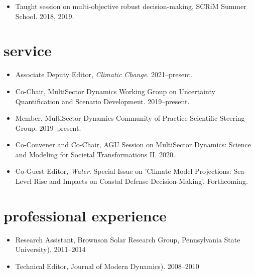 \documentclass[11pt,article,oneside]{memoir}
\begin{document}
\mbox{}\vspace{-\dimexpr\baselineskip\relax}

\begin{itemize}[label={}]

\item Taught session on multi-objective robust decision-making, SCRiM Summer School. 2018, 2019.

\end{itemize}


\section{service}

\mbox{}\vspace{-\dimexpr\baselineskip\relax}

\begin{itemize}[label={}]

\item Associate Deputy Editor, \emph{Climatic Change}.  2021--present.

\item Co-Chair, MultiSector Dynamics Working Group on Uncertainty Quantification and Scenario Development. 2019--present.

\item Member, MultiSector Dynamics Community of Practice Scientific Steering Group. 2019--present.

\item Co-Convener and Co-Chair, AGU Session on MultiSector Dynamics: Science and Modeling for Societal Transformations II. 2020.

\item Co-Guest Editor, \emph{Water}. Special Issue on 'Climate Model Projections: Sea-Level Rise and Impacts on Coastal Defense Decision-Making'. Forthcoming.

\end{itemize}


\section{professional experience}

\mbox{}\vspace{-\dimexpr\baselineskip\relax}

\begin{itemize}[label={}]

\item Research Assistant, Brownson Solar Research Group, Pennsylvania State University). 2011--2014

\item Technical Editor, Journal of Modern Dynamics). 2008--2010

\end{itemize}
\end{document}
